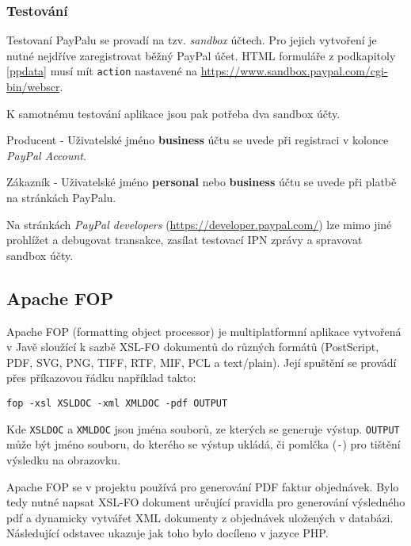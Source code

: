 \documentclass[12pt]{article}
\begin{document}
\subsubsection{Testování}

Testovaní PayPalu se provadí na tzv. \emph{sandbox} účtech. Pro jejich vytvoření je nutné nejdříve zaregistrovat běžný PayPal účet. HTML formuláře z podkapitoly \ref{ppdata} musí mít \texttt{action} nastavené na \url{https://www.sandbox.paypal.com/cgi-bin/webscr}.\newline

K samotnému testování aplikace jsou pak potřeba dva sandbox účty.

\begin{description}
\item{Producent} - Uživatelské jméno \textbf{business} účtu se uvede při registraci v kolonce \emph{PayPal Account}.
\item{Zákazník} - Uživatelské jméno \textbf{personal} nebo \textbf{business} účtu se uvede při platbě na stránkách PayPalu.
\end{description}

Na stránkách \emph{PayPal developers} (\url{https://developer.paypal.com/}) lze mimo jiné prohlížet a debugovat transakce, zasílat testovací IPN zprávy a spravovat sandbox účty.

\subsection{Apache FOP}\label{fop}

Apache FOP (formatting object processor) je multiplatformní aplikace vytvořená v Javě sloužící k sazbě XSL-FO dokumentů do různých formátů (PostScript, PDF, SVG, PNG, TIFF, RTF, MIF, PCL a text/plain).
Její spuštění se provádí přes příkazovou řádku například takto:

\begin{lstlisting}
fop -xsl XSLDOC -xml XMLDOC -pdf OUTPUT
\end{lstlisting}

Kde \texttt{XSLDOC} a \texttt{XMLDOC} jsou jména souborů, ze kterých se generuje výstup. \texttt{OUTPUT} může být jméno souboru, do kterého se výstup ukládá, či pomlčka (\texttt{-}) pro tištění výsledku na obrazovku.

Apache FOP se v projektu používá pro generování PDF faktur objednávek. Bylo tedy nutné napsat XSL-FO dokument\cite{ku} určující pravidla pro generování výsledného pdf a dynamicky vytvářet XML dokumenty z objednávek uložených v databázi.
Následující odstavec ukazuje jak toho bylo docíleno v jazyce PHP.\newline
\end{document}
